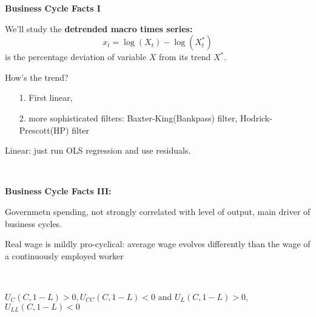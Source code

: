 \textbf{Business Cycle Facts I}

We'll study the \textbf{detrended macro times series:}
\[ x_t = \log (X_t) - \log (X_t^{\ast}) \]
is the percentage deviation of variable $X$ from its trend $X^{\ast}$.

How's the trend?

\begin{enumerate}
  \item[1.] First linear,
  
  \item[2.] more sophisticated filters: Baxter-King(Bankpass) filter,
  Hodrick-Prescott(HP) filter
\end{enumerate}

Linear: just run OLS regression and use residuals.

\

\textbf{Business Cycle Facts III:}

Governmetn spending, not strongly correlated with level of output, main driver
of business cycles.

Real wage is mildly pro-cyclical: average wage evolves differently than the
wage of a continuously employed worker

\

$U_C (C, 1 - L) > 0, U_{C C} (C, 1 - L) < 0$ and $U_L (C, 1 - L) > 0$, $U_{L
L} (C, 1 - L) < 0$
